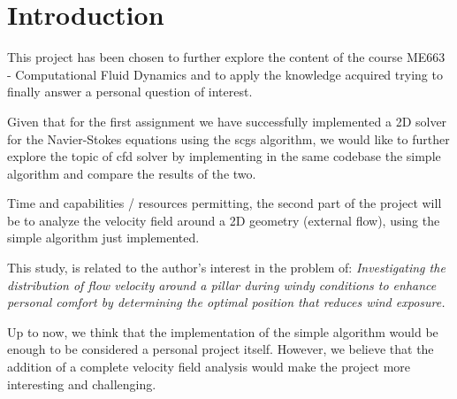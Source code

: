 \section{Introduction}

This project has been chosen to further explore the content of the course ME663 - Computational Fluid Dynamics and to apply the knowledge acquired trying to finally answer a personal question of interest.

Given that for the first assignment we have successfully implemented a 2D solver for the Navier-Stokes equations using the \acrshort{scgs} algorithm, we would like to further explore the topic of \acrshort{cfd} solver by implementing in the same codebase the \acrshort{simple} algorithm and compare the results of the two.

Time and capabilities / resources permitting, the second part of the project will be to analyze the velocity field around a 2D geometry (external flow), using the \acrshort{simple} algorithm just implemented.

This study, is related to the author's interest in the problem of: \emph{Investigating the distribution of flow velocity around a pillar during windy conditions to enhance personal comfort by determining the optimal position that reduces wind exposure.}

Up to now, we think that the implementation of the \acrshort{simple} algorithm would be enough to be considered a personal project itself.
However, we believe that the addition of a complete velocity field analysis would make the project more interesting and challenging.


